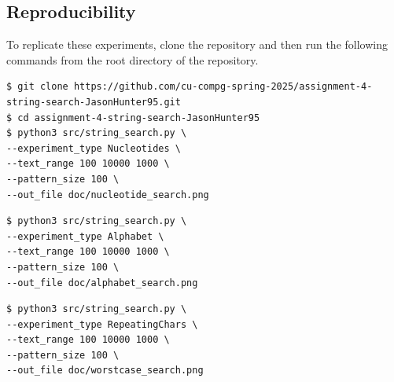 \documentclass[11pt, letterpaper]{article}
\begin{document}
\subsection{Reproducibility}
To replicate these experiments, clone the repository and then run the
following commands from the root directory of the repository.
\begin{verbatim}
$ git clone https://github.com/cu-compg-spring-2025/assignment-4-string-search-JasonHunter95.git
$ cd assignment-4-string-search-JasonHunter95
$ python3 src/string_search.py \
--experiment_type Nucleotides \
--text_range 100 10000 1000 \
--pattern_size 100 \
--out_file doc/nucleotide_search.png
\end{verbatim}

\begin{verbatim}
$ python3 src/string_search.py \
--experiment_type Alphabet \
--text_range 100 10000 1000 \
--pattern_size 100 \
--out_file doc/alphabet_search.png
\end{verbatim}

\begin{verbatim}
$ python3 src/string_search.py \
--experiment_type RepeatingChars \
--text_range 100 10000 1000 \
--pattern_size 100 \
--out_file doc/worstcase_search.png
\end{verbatim}

\end{document}

